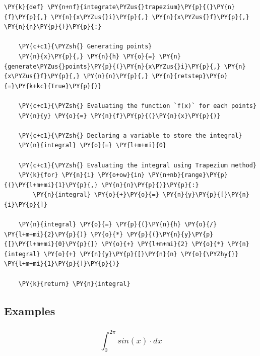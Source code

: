     \begin{tcolorbox}[breakable, size=fbox, boxrule=1pt, pad at break*=1mm,colback=cellbackground, colframe=cellborder]
\begin{Verbatim}[commandchars=\\\{\}]
\PY{k}{def} \PY{n+nf}{integrate\PYZus{}trapezium}\PY{p}{(}\PY{n}{f}\PY{p}{,} \PY{n}{x\PYZus{}i}\PY{p}{,} \PY{n}{x\PYZus{}f}\PY{p}{,} \PY{n}{n}\PY{p}{)}\PY{p}{:}

    \PY{c+c1}{\PYZsh{} Generating points}
    \PY{n}{x}\PY{p}{,} \PY{n}{h} \PY{o}{=} \PY{n}{generate\PYZus{}points}\PY{p}{(}\PY{n}{x\PYZus{}i}\PY{p}{,} \PY{n}{x\PYZus{}f}\PY{p}{,} \PY{n}{n}\PY{p}{,} \PY{n}{retstep}\PY{o}{=}\PY{k+kc}{True}\PY{p}{)}

    \PY{c+c1}{\PYZsh{} Evaluating the function `f(x)` for each points}
    \PY{n}{y} \PY{o}{=} \PY{n}{f}\PY{p}{(}\PY{n}{x}\PY{p}{)}

    \PY{c+c1}{\PYZsh{} Declaring a variable to store the integral}
    \PY{n}{integral} \PY{o}{=} \PY{l+m+mi}{0}

    \PY{c+c1}{\PYZsh{} Evaluating the integral using Trapezium method}
    \PY{k}{for} \PY{n}{i} \PY{o+ow}{in} \PY{n+nb}{range}\PY{p}{(}\PY{l+m+mi}{1}\PY{p}{,} \PY{n}{n}\PY{p}{)}\PY{p}{:}
        \PY{n}{integral} \PY{o}{+}\PY{o}{=} \PY{n}{y}\PY{p}{[}\PY{n}{i}\PY{p}{]}

    \PY{n}{integral} \PY{o}{=} \PY{p}{(}\PY{n}{h} \PY{o}{/} \PY{l+m+mi}{2}\PY{p}{)} \PY{o}{*} \PY{p}{(}\PY{n}{y}\PY{p}{[}\PY{l+m+mi}{0}\PY{p}{]} \PY{o}{+} \PY{l+m+mi}{2} \PY{o}{*} \PY{n}{integral} \PY{o}{+} \PY{n}{y}\PY{p}{[}\PY{n}{n} \PY{o}{\PYZhy{}} \PY{l+m+mi}{1}\PY{p}{]}\PY{p}{)}

    \PY{k}{return} \PY{n}{integral}
\end{Verbatim}
\end{tcolorbox}

    \hypertarget{examples}{%
\subsection{Examples}\label{examples}}

    \hypertarget{int_02pi-sinx-cdot-dx}{%
\subsubsection{\texorpdfstring{\[\int_{0}^{2\pi} sin(x) \cdot dx\]}{\textbackslash int\_\{0\}\^{}\{2\textbackslash pi\} sin(x) \textbackslash cdot dx}}\label{int_02pi-sinx-cdot-dx}}

